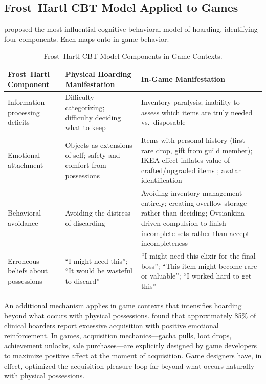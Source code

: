 \documentclass[12pt]{article}
\begin{document}
\subsection{Frost--Hartl CBT Model Applied to Games}

\citet{Frost1996} proposed the most influential cognitive-behavioral model of hoarding, identifying four components. Each maps onto in-game behavior.

\begin{table}[ht]
\centering
\caption{Frost--Hartl CBT Model Components in Game Contexts.}
\small
\begin{tabular}{p{2.8cm}p{4cm}p{6cm}}
\toprule
Frost--Hartl Component & Physical Hoarding Manifestation & In-Game Manifestation \\
\midrule
Information processing deficits & Difficulty categorizing; difficulty deciding what to keep & Inventory paralysis; inability to assess which items are truly needed vs.\ disposable \\
Emotional attachment & Objects as extensions of self; safety and comfort from possessions & Items with personal history (first rare drop, gift from guild member); IKEA effect inflates value of crafted/upgraded items \citep{Norton2012}; avatar identification \citep{Boffel2021} \\
Behavioral avoidance & Avoiding the distress of discarding & Avoiding inventory management entirely; creating overflow storage rather than deciding; Ovsiankina-driven compulsion to finish incomplete sets rather than accept incompleteness \\
Erroneous beliefs about possessions & ``I might need this''; ``It would be wasteful to discard'' & ``I might need this elixir for the final boss''; ``This item might become rare or valuable''; ``I worked hard to get this'' \\
\bottomrule
\end{tabular}
\end{table}

An additional mechanism applies in game contexts that intensifies hoarding beyond what occurs with physical possessions. \citet{Frost1998} found that approximately 85\% of clinical hoarders report excessive acquisition with positive emotional reinforcement. In games, acquisition mechanics---gacha pulls, loot drops, achievement unlocks, sale purchases---are explicitly designed by game developers to maximize positive affect at the moment of acquisition. Game designers have, in effect, optimized the acquisition-pleasure loop far beyond what occurs naturally with physical possessions.
\end{document}
